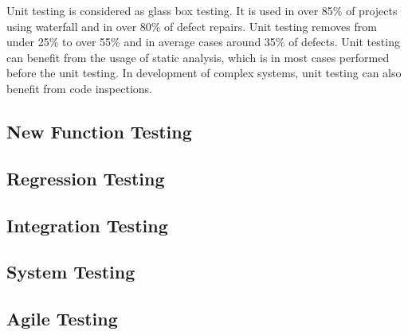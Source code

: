  Unit testing is considered as glass box testing. It is used in over 85\% of projects using waterfall and in over 80\% of defect repairs. Unit testing removes from under 25\% to over 55\% and in average cases around 35\% of defects. Unit testing can benefit from the usage of static analysis, which is in most cases performed before the unit testing. In development of complex systems, unit testing can also benefit from code inspections.


 \subsection{New Function Testing}

 \subsection{Regression Testing}

 \subsection{Integration Testing}

 \subsection{System Testing}

 \subsection{Agile Testing}